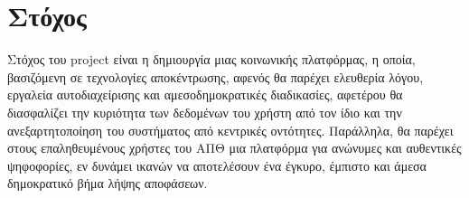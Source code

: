 \section{Στόχος}

Στόχος του project είναι η δημιουργία μιας κοινωνικής πλατφόρμας, η οποία, βασιζόμενη σε τεχνολογίες αποκέντρωσης, αφενός θα παρέχει ελευθερία λόγου, εργαλεία αυτοδιαχείρισης και αμεσοδημοκρατικές διαδικασίες, αφετέρου θα διασφαλίζει την κυριότητα των δεδομένων του χρήστη από τον ίδιο και την ανεξαρτητοποίηση του συστήματος από κεντρικές οντότητες. Παράλληλα, θα παρέχει στους επαληθευμένους χρήστες του ΑΠΘ μια πλατφόρμα για ανώνυμες και αυθεντικές ψηφοφορίες, εν δυνάμει ικανών να αποτελέσουν ένα έγκυρο, έμπιστο και άμεσα δημοκρατικό βήμα λήψης αποφάσεων.
